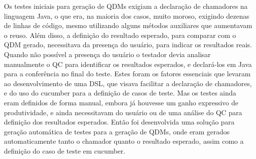 Os testes iniciais para geração de QDMs exigiam a declaração de chamadores na linguagem Java, o que era, na maioria dos casos, muito moroso, exigindo dezenas de linhas de código, mesmo utilizando alguns métodos auxiliares que aumentavam o reuso. Além disso, a definição do resultado esperado, para comparar com o QDM gerado, necessitava da presença do usuário, para indicar os resultados reais. Quando não possível a presença do usuário o testador devia analisar manualmente o QC para identificar os resultados esperados, e declará-los em Java para a conferência no final do teste. Estes foram os fatores essenciais que levaram ao desenvolvimento de uma DSL, que visava facilitar a declaração de chamadores, e do uso do cucumber para a definição de casos de teste. Mas os testes ainda eram definidos de forma manual, embora já houvesse um ganho expressivo de produtividade, e ainda necessitavam do usuário ou de uma análise do QC para definição dos resultados esperados. Então foi desenvolvida uma solução para geração automática de testes para a geração de QDMs, onde eram gerados automaticamente tanto o chamador quanto o resultado esperado, assim como a definição do caso de teste em cucumber.


